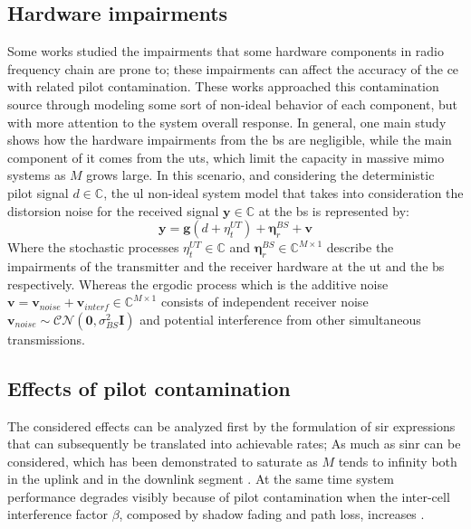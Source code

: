 \documentclass[11pt]{book}
\begin{document}
\subsection{Hardware impairments}
Some works studied the impairments that some hardware components in radio frequency chain are prone to; these impairments can affect the accuracy of the \gls{ce} with related pilot contamination. These works approached this contamination source through modeling some sort of non-ideal behavior of each component, but with more attention to the system overall response. In general, one main study \cite{Bjornson2014} shows how the hardware impairments from the \gls{bs} are negligible, while the main component of it comes from the \gls{ut}s, which limit the capacity in massive \gls{mimo} systems as $M$ grows large. In this scenario, and considering the deterministic pilot signal $d \in \mathbb{C}$, the \gls{ul} non-ideal system model that takes into consideration the distorsion noise for the received signal $\textbf{y} \in \mathbb{C}$ at the \gls{bs} is represented by:
\begin{equation}
  \textbf{y} = \textbf{g}(d + {\eta}_t^{UT}) + \boldsymbol{\eta}_r^{BS} + \textbf{v}
\end{equation}
Where the stochastic processes $\eta_t^{UT} \in \mathbb{C}$ and $\boldsymbol{\eta}_r^{BS} \in \mathbb{C}^{M\times 1}$ describe the impairments of the transmitter and the receiver hardware at the \gls{ut} and the \gls{bs} respectively. Whereas the ergodic process which is the additive noise $\textbf{v} = \textbf{v}_{noise} + \textbf{v}_{interf} \in \mathbb{C}^{M\times 1}$ consists of independent receiver noise $\textbf{v}_{noise} \sim \mathcal{CN}(\textbf{0},\sigma_{BS}^2\textbf{I})$ and potential interference from other simultaneous transmissions.

\subsection{Effects of pilot contamination}
The considered effects can be analyzed first by the formulation of \gls{sir} expressions that can subsequently be translated into achievable rates; As much as \gls{sinr} can be considered, which has been demonstrated to saturate as $M$ tends to infinity both in the uplink and in the downlink segment \cite{Elijah2016} \cite{Buzzi}. At the same time system performance degrades visibly because of pilot contamination when the inter-cell interference factor $\beta$, composed by shadow fading and path loss, increases \cite{Elijah2016}.
\end{document}
